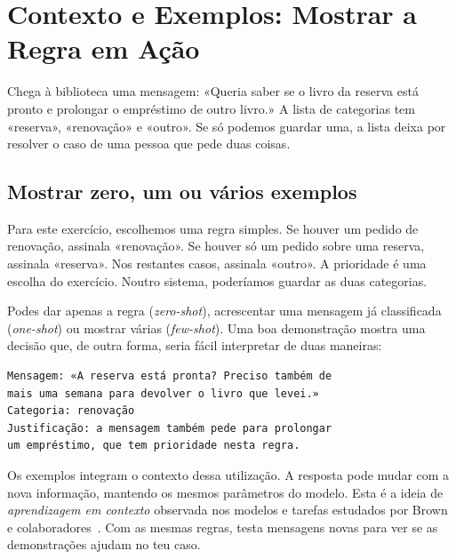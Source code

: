 \chapter{Contexto e Exemplos: Mostrar a Regra em Ação}
\label{ch:contexto}

\ficcao Chega à biblioteca uma mensagem: «Queria saber se o livro da reserva está pronto e prolongar o empréstimo de outro livro.» A lista de categorias tem «reserva», «renovação» e «outro». Se só podemos guardar uma, a lista deixa por resolver o caso de uma pessoa que pede duas coisas.

\section{Mostrar zero, um ou vários exemplos}

Para este exercício, escolhemos uma regra simples. Se houver um pedido de renovação, assinala «renovação». Se houver só um pedido sobre uma reserva, assinala «reserva». Nos restantes casos, assinala «outro». A prioridade é uma escolha do exercício. Noutro sistema, poderíamos guardar as duas categorias.

Podes dar apenas a regra (\emph{zero-shot}), acrescentar uma mensagem já classificada (\emph{one-shot}) ou mostrar várias (\emph{few-shot}). Uma boa demonstração mostra uma decisão que, de outra forma, seria fácil interpretar de duas maneiras:

\begin{lstlisting}
Mensagem: «A reserva está pronta? Preciso também de
mais uma semana para devolver o livro que levei.»
Categoria: renovação
Justificação: a mensagem também pede para prolongar
um empréstimo, que tem prioridade nesta regra.
\end{lstlisting}

Os exemplos integram o contexto dessa utilização. A resposta pode mudar com a nova informação, mantendo os mesmos parâmetros do modelo. Esta é a ideia de \emph{aprendizagem em contexto} observada nos modelos e tarefas estudados por Brown e colaboradores~\citep{brown2020}. Com as mesmas regras, testa mensagens novas para ver se as demonstrações ajudam no teu caso.

